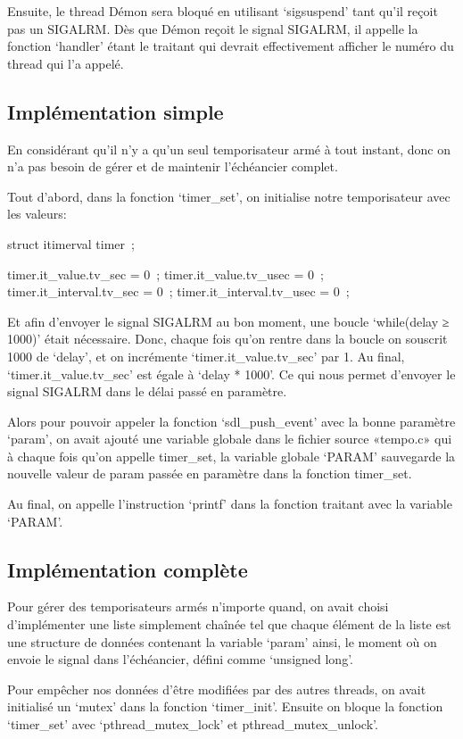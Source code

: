 \documentclass{article}
\begin{document}
Ensuite, le thread Démon sera bloqué en utilisant ‘sigsuspend’ tant qu’il reçoit pas un SIGALRM.
Dès que Démon reçoit le signal SIGALRM, il appelle la fonction ‘handler’ étant le traitant qui devrait effectivement afficher le numéro du thread qui l’a appelé.

\subsection{Implémentation simple}

En considérant qu’il n’y a qu’un seul temporisateur armé à tout instant, donc on n’a pas besoin de gérer et de maintenir l’échéancier complet. 

Tout d’abord, dans la fonction ‘timer\_set’, on initialise notre temporisateur avec les valeurs:

struct itimerval timer ;

timer.it\_value.tv\_sec = 0 ;
timer.it\_value.tv\_usec = 0 ;
timer.it\_interval.tv\_sec = 0 ;
timer.it\_interval.tv\_usec = 0 ;

Et afin d’envoyer le signal SIGALRM au bon moment, une boucle ‘while(delay ≥ 1000)’ était nécessaire. Donc, chaque fois qu’on rentre dans la boucle on souscrit 1000 de ‘delay’, et on incrémente  ‘timer.it\_value.tv\_sec’ par 1. Au final, ‘timer.it\_value.tv\_sec’ est égale à ‘delay * 1000’.
Ce qui nous permet d’envoyer le signal SIGALRM dans le délai passé en paramètre.

Alors pour pouvoir appeler la fonction ‘sdl\_push\_event’ avec la bonne paramètre ‘param’, on avait ajouté une variable globale dans le fichier source «tempo.c» qui à chaque fois qu’on appelle timer\_set, la variable globale ‘PARAM’ sauvegarde la nouvelle valeur de param passée en paramètre dans la fonction timer_set.

Au final, on appelle l’instruction ‘printf’ dans la fonction traitant avec la variable ‘PARAM’.

\subsection{Implémentation complète}

Pour gérer des temporisateurs armés n’importe quand, on avait choisi d’implémenter une liste simplement chaînée tel que chaque élément de la liste est une structure de données contenant la variable ‘param’ ainsi, le moment où on envoie le signal dans l’échéancier, défini comme ‘unsigned long’.

Pour empêcher nos données d’être modifiées par des autres threads, on avait initialisé un ‘mutex’ dans la fonction ‘timer\_init’. Ensuite on bloque la fonction ‘timer\_set’ avec ‘pthread\_mutex\_lock’ et pthread\_mutex\_unlock’.
\end{document}
